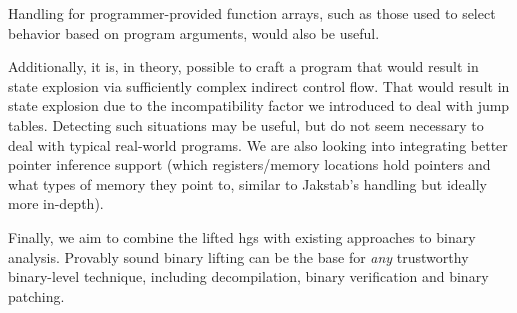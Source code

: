 Handling for programmer-provided function arrays, such as those used to select behavior
based on program arguments, would also be useful.

Additionally, it is, in theory, possible to craft a program that would result in state explosion via sufficiently complex indirect control flow.
That would result in state explosion due to the incompatibility factor we introduced to deal with jump tables.
Detecting such situations may be useful, but do not seem necessary to deal with typical real-world programs.
We are also looking into integrating better pointer inference support (which registers/memory locations hold pointers and what types of memory they point to, similar to Jakstab's handling but ideally more in-depth).

Finally, we aim to combine the lifted \acp{hg} with existing approaches to binary analysis.
Provably sound binary lifting can be the base for \emph{any} trustworthy binary-level technique,
including decompilation, binary verification and binary patching.

